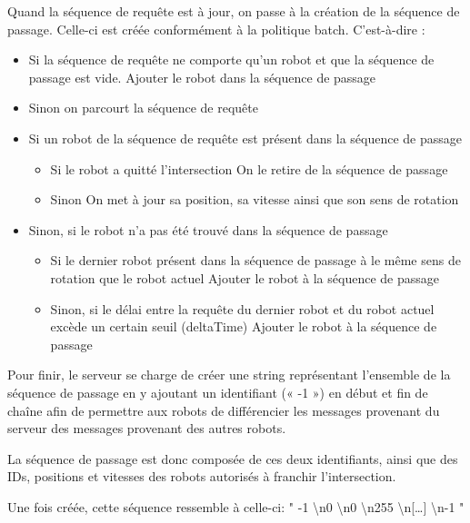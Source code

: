 \documentclass[french,a4paper,12pt]{report}
\begin{document}
Quand la séquence de requête est à jour, on passe à la création de la séquence de passage. Celle-ci est créée conformément à la politique batch. C’est-à-dire :
\begin{itemize}
\item Si la séquence de requête ne comporte qu’un robot et que la séquence de passage est vide.
	Ajouter le robot dans la séquence de passage
	
\item Sinon on parcourt la séquence de requête

\item Si un robot de la séquence de requête est présent dans la séquence de passage
	\begin{itemize}
	\item Si le robot a quitté l’intersection
		On le retire de la séquence de passage
		
	\item Sinon
		On met à jour sa position, sa vitesse ainsi que son sens de rotation
	\end{itemize}
	
\item Sinon, si le robot n’a pas été trouvé dans la séquence de passage
	\begin{itemize}
	\item Si le dernier robot présent dans la séquence de passage à le même sens de rotation que le robot actuel
		Ajouter le robot à la séquence de passage
		
	\item Sinon, si le délai entre la requête du dernier robot et du robot actuel excède un certain seuil (deltaTime)
		Ajouter le robot à la séquence de passage
	\end{itemize}	
\end{itemize}

Pour finir, le serveur se charge de créer une string représentant l’ensemble de la séquence de passage en y ajoutant un identifiant (« -1 ») en début et fin de chaîne afin de permettre aux robots de différencier les messages provenant du serveur des messages provenant des autres robots.

La séquence de passage est donc composée de ces deux identifiants, ainsi que des IDs, positions et vitesses des robots autorisés à franchir l’intersection. 

Une fois créée, cette séquence ressemble à celle-ci: " -1 \textbackslash n0 \textbackslash n0 \textbackslash n255 \textbackslash n[…] \textbackslash n-1 " \newline
 
\end{document}
